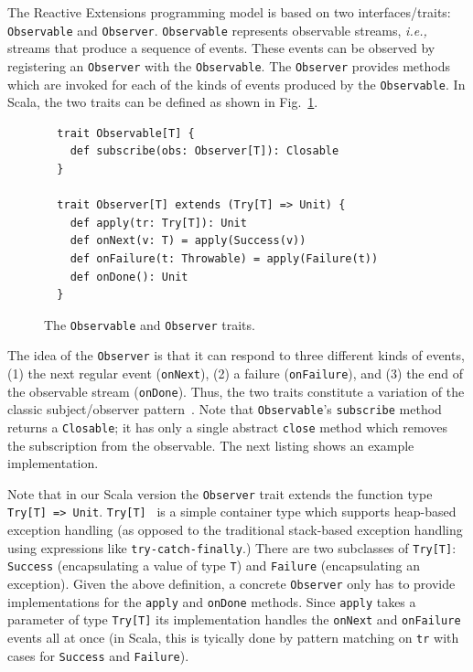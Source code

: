 \documentclass[runningheads]{llncs}
\newcommand{\ie}{{\em i.e.,~}}
\begin{document}
\begin{sloppypar}
The Reactive Extensions programming model is based on two interfaces/traits: \verb|Observable|
and \verb|Observer|. \verb|Observable| represents observable streams, \ie
streams that produce a sequence of events. These events can be observed by
registering an \verb|Observer| with the \verb|Observable|. The \verb|Observer|
provides methods which are invoked for each of the kinds of events produced by
the \verb|Observable|. In Scala, the two traits can be defined as shown in
Fig.~\ref{fig:observable-observer}.

\begin{figure}[ht!]
  \centering
  \lstset{numbers=none,xleftmargin=0em}
  \begin{lstlisting}
  trait Observable[T] {
    def subscribe(obs: Observer[T]): Closable
  }

  trait Observer[T] extends (Try[T] => Unit) {
    def apply(tr: Try[T]): Unit
    def onNext(v: T) = apply(Success(v))
    def onFailure(t: Throwable) = apply(Failure(t))
    def onDone(): Unit
  }
  \end{lstlisting}
  \caption{The \texttt{Observable} and \texttt{Observer} traits.}
  \label{fig:observable-observer}
\end{figure}

The idea of the \verb|Observer| is that it can respond to three different
kinds of events, (1) the next regular event (\verb|onNext|), (2) a failure
(\verb|onFailure|), and (3) the end of the observable stream (\verb|onDone|).
Thus, the two traits constitute a variation of the classic subject/observer
pattern~\cite{EugsterFGK03}. Note that \verb|Observable|'s \verb|subscribe|
method returns a \verb|Closable|; it has only a single abstract \verb|close|
method which removes the subscription from the observable. The next listing
shows an example implementation.

Note that in our Scala version the \verb|Observer| trait extends the function
type \verb|Try[T] => Unit|. \verb|Try[T]|~\cite{FuturesSIP} is a simple container type which
supports heap-based exception handling (as opposed to the traditional stack-based
exception handling using expressions like \verb|try-catch-finally|.)
There are two subclasses of \verb|Try[T]|: \verb|Success| (encapsulating a
value of type \verb|T|) and \verb|Failure| (encapsulating an exception). Given
the above definition, a concrete \verb|Observer| only has to provide
implementations for the \verb|apply| and \verb|onDone| methods. Since
\verb|apply| takes a parameter of type \verb|Try[T]| its implementation
handles the \verb|onNext| and \verb|onFailure| events all at once (in Scala,
this is tyically done by pattern matching on \verb|tr| with cases for
\verb|Success| and \verb|Failure|).


\end{sloppypar}
\end{document}
